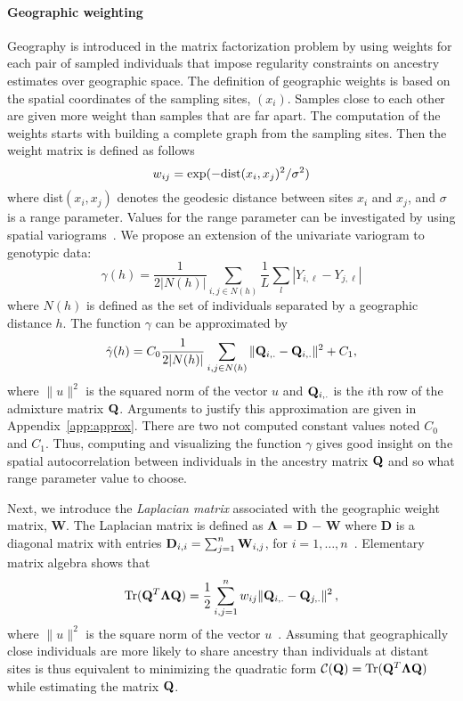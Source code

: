  \paragraph{Geographic weighting} Geography is introduced in the matrix factorization problem by using weights for each pair of sampled individuals that impose regularity constraints on ancestry estimates over geographic space. The definition of geographic weights is based on the spatial coordinates of the sampling sites, $(x_i)$. Samples close to each other are given more weight than samples that are far apart. The computation of the weights starts with building a complete graph from the sampling sites. Then the weight matrix is defined as follows
$$
w_{ij} = \exp( - {\rm dist}( x_i, x_j )^2/ \sigma^2)
$$
\noindent where dist$( x_i, x_j )$ denotes the geodesic distance between sites $x_i$ and  $x_j$, and $\sigma$ is a range parameter. Values for the range parameter can be investigated by using spatial variograms~\citep{Cressie1993}. 
{ \color{blue} We propose an extension of the univariate variogram to genotypic data:
\begin{equation}
\gamma(h) = \frac{1}{2 |N(h)|} \sum_{i,j \in N(h)} \frac{1}{L} \sum_{l} |Y_{i,\ell} - Y_{j,\ell}|
\label{eq:gamma}
\end{equation}
\noindent where $N(h)$ is defined as the set of individuals separated by a geographic distance $h$. The function $\gamma$ can be approximated by 
\begin{equation}
\hat{\gamma}(h) = {C}_0 \frac{1}{2 |N(h)|} \sum_{i,j \in N(h)} \| {\bf Q}_{i,.} - {\bf Q}_{i,.}\|^2 + {C}_1, 
\label{eq:gammahat}
\end{equation}
\noindent where $\|  u \|^2$ is the squared norm of the vector $u$ and ${\bf Q}_{i,.}$ is the $i$th row of the admixture matrix ${\bf Q}$. Arguments to justify this approximation are given in Appendix~\ref{app:approx}. There are two not computed constant values noted ${C}_0$ and ${C}_1$. Thus, computing and visualizing the function $\gamma$ gives good insight on the spatial autocorrelation between individuals in the ancestry matrix ${\bf Q}$ and so what range parameter value to choose. 
}

Next, we introduce the {\it Laplacian matrix} associated with the geographic weight matrix, {\bf W}. The Laplacian matrix is defined as ${\bf \Lambda}$ =  {\bf D} $-$ {\bf W}  where  {\bf D} is a diagonal matrix with entries 
${\bf D}_{i,i} = \sum_{j = 1}^n  {\bf W}_{i,j}$,  for  $i = 1, \dots, n$~\citep{Belkin2003}. Elementary matrix algebra shows that 
$$
 {\rm Tr} ({\bf Q}^T {\bf \Lambda} {\bf Q})  = \frac12 \sum_{i,j = 1}^n  w_{ij}  \|   {\bf Q}_{i,.}  - {\bf Q}_{j,.} \|^2 \, ,
$$
\noindent where $\|  u \|^2$ is the square norm of the vector $u$~\citep{DengCai2011}. Assuming that geographically close individuals are more likely to share ancestry than individuals at distant sites is thus equivalent to minimizing the quadratic form ${\cal C}({\bf Q}) ={\rm Tr} ({\bf Q}^T {\bf \Lambda} {\bf Q})$ while estimating the matrix ${\bf Q}$. 

